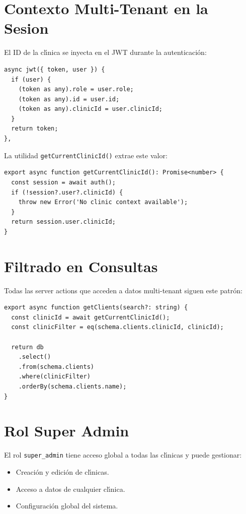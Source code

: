 \section{Contexto Multi-Tenant en la Sesion}

El ID de la cl\'{\i}nica se inyecta en el JWT durante la autenticaci\'on:

\begin{lstlisting}[style=typescript, caption=JWT callback - Inyeccion de clinicId]
async jwt({ token, user }) {
  if (user) {
    (token as any).role = user.role;
    (token as any).id = user.id;
    (token as any).clinicId = user.clinicId;
  }
  return token;
},
\end{lstlisting}

La utilidad \texttt{getCurrentClinicId()} extrae este valor:

\begin{lstlisting}[style=typescript, caption=Obtencion del clinicId desde la sesion]
export async function getCurrentClinicId(): Promise<number> {
  const session = await auth();
  if (!session?.user?.clinicId) {
    throw new Error('No clinic context available');
  }
  return session.user.clinicId;
}
\end{lstlisting}

\section{Filtrado en Consultas}

Todas las server actions que acceden a datos multi-tenant siguen este
patr\'on:

\begin{lstlisting}[style=typescript, caption=Patron de filtrado por clinica]
export async function getClients(search?: string) {
  const clinicId = await getCurrentClinicId();
  const clinicFilter = eq(schema.clients.clinicId, clinicId);

  return db
    .select()
    .from(schema.clients)
    .where(clinicFilter)
    .orderBy(schema.clients.name);
}
\end{lstlisting}

\section{Rol Super Admin}

El rol \texttt{super\_admin} tiene acceso global a todas las cl\'{\i}nicas
y puede gestionar:

\begin{itemize}[leftmargin=*]
    \item Creaci\'on y edici\'on de cl\'{\i}nicas.
    \item Acceso a datos de cualquier cl\'{\i}nica.
    \item Configuraci\'on global del sistema.
\end{itemize}

